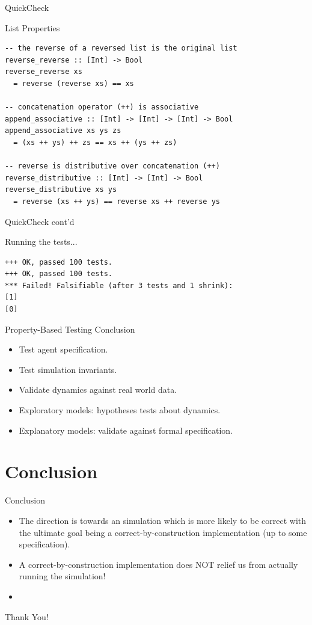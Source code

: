 \documentclass{beamer}
\begin{document}
\begin{frame}[fragile]{QuickCheck}
\begin{block}{List Properties}
\begin{verbatim}
-- the reverse of a reversed list is the original list
reverse_reverse :: [Int] -> Bool
reverse_reverse xs 
  = reverse (reverse xs) == xs

-- concatenation operator (++) is associative
append_associative :: [Int] -> [Int] -> [Int] -> Bool
append_associative xs ys zs 
  = (xs ++ ys) ++ zs == xs ++ (ys ++ zs)

-- reverse is distributive over concatenation (++)
reverse_distributive :: [Int] -> [Int] -> Bool
reverse_distributive xs ys 
  = reverse (xs ++ ys) == reverse xs ++ reverse ys
\end{verbatim}
\end{block}
\end{frame}

\begin{frame}[fragile]{QuickCheck cont'd}
\begin{block}{Running the tests...}
\begin{footnotesize}
\begin{verbatim}
+++ OK, passed 100 tests.
+++ OK, passed 100 tests.
*** Failed! Falsifiable (after 3 tests and 1 shrink):     
[1]
[0]
\end{verbatim}
\end{footnotesize}
\end{block}
\end{frame}

\begin{frame}{Property-Based Testing Conclusion}
  \begin{itemize}
    \item Test agent specification.
    \item Test simulation invariants.
    \item Validate dynamics against real world data.
    \item Exploratory models: hypotheses tests about dynamics.
    \item Explanatory models: validate against formal specification.
  \end{itemize}
\end{frame}

\section{Conclusion}
\begin{frame}{Conclusion}
  \begin{itemize}
    \item The direction is towards an simulation which is more likely to be correct with the ultimate goal being a correct-by-construction implementation (up to some specification).
    \item A correct-by-construction implementation does NOT relief us from actually running the simulation!
    \item 
  \end{itemize}
\end{frame}

\begin{frame}{}
  \begin{center}
  Thank You!
  \end{center}
\end{frame}
\end{document}
